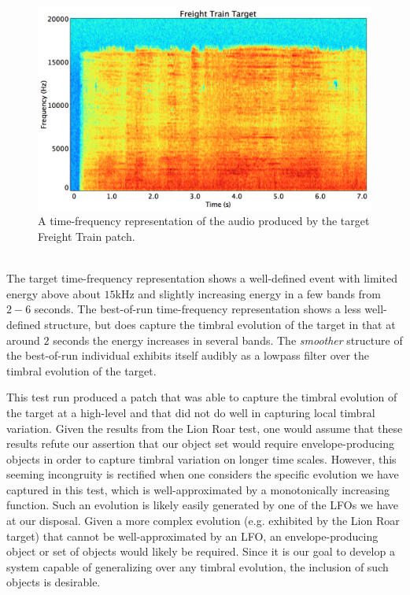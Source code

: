 \documentclass[a4paper,12pt]{report} 	%
\numberwithin{figure}{chapter}
\numberwithin{table}{chapter}
\numberwithin{equation}{chapter}
\begin{document}
\begin{flushleft}
\begin{figure}[h!]
\begin{center}
\includegraphics[scale=0.35,width=\linewidth]{FreightTrainTargetSTFT}
\caption[Target Freight Train Time-Frequency Representation]{A time-frequency representation of the audio produced by the target Freight Train patch.}
\end{center}
\end{figure}
\\
The target time-frequency representation shows a well-defined event with limited energy above about $15$kHz and slightly increasing energy in a few bands from $2-6$ seconds. The best-of-run time-frequency representation shows a less well-defined structure, but does capture the timbral evolution of the target in that at around $2$ seconds the energy increases in several bands. The \emph{smoother} structure of the best-of-run individual exhibits itself audibly as a lowpass filter over the timbral evolution of the target.

This test run produced a patch that was able to capture the timbral evolution of the target at a high-level and that did not do well in capturing local timbral variation. Given the results from the Lion Roar test, one would assume that these results refute our assertion that our object set would require envelope-producing objects in order to capture timbral variation on longer time scales. However, this seeming incongruity is rectified when one considers the specific evolution we have captured in this test, which is well-approximated by a monotonically increasing function. Such an evolution is likely easily generated by one of the LFOs we have at our disposal. Given a more complex evolution (e.g. exhibited by the Lion Roar target) that cannot be well-approximated by an LFO, an envelope-producing object or set of objects would likely be required. Since it is our goal to develop a system capable of generalizing over any timbral evolution, the inclusion of such objects is desirable.


\end{flushleft}
\end{document}

